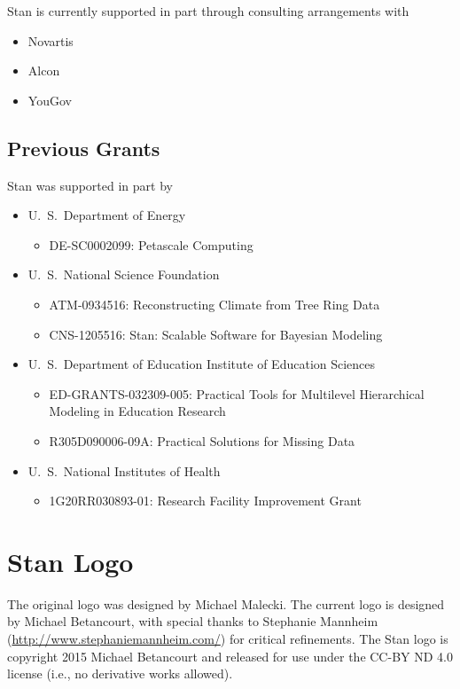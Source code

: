 Stan is currently supported in part through consulting arrangements
with
\begin{itemize}
\item Novartis 
\item Alcon
\item YouGov
\end{itemize}


\subsection*{Previous Grants}

Stan was supported in part by 
%
\begin{itemize}
\item
U.~S.\ Department of Energy 
\begin{itemize}\small
\item DE-SC0002099: Petascale Computing
\end{itemize}
%
\item
U.~S.\ National Science Foundation 
\begin{itemize}\small
\item
ATM-0934516: Reconstructing Climate from Tree Ring Data
\item
CNS-1205516: Stan: Scalable Software for Bayesian Modeling
\end{itemize}
%
\item
U.~S.\ Department of Education Institute of Education Sciences 
\begin{itemize}\small
\item ED-GRANTS-032309-005:
Practical Tools for Multilevel Hierarchical Modeling in Education
 Research
\item R305D090006-09A: Practical Solutions for Missing Data
\end{itemize}
\item
U.~S.\ National Institutes of Health
\begin{itemize}
\item 1G20RR030893-01: Research Facility Improvement Grant
\end{itemize}
\end{itemize}


\section*{Stan Logo}

The original logo was designed by Michael Malecki.  The current logo
is designed by Michael Betancourt, with special thanks to Stephanie
Mannheim (\url{http://www.stephaniemannheim.com/}) for critical
refinements.  The Stan logo is copyright 2015 Michael Betancourt and
released for use under the CC-BY ND 4.0 license (i.e., no derivative
works allowed).



